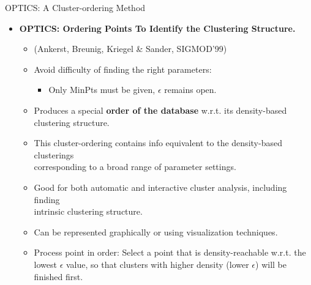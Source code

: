 \begin{frame}{OPTICS: A Cluster-ordering Method}
	\begin{itemize}
		\item \textbf{OPTICS: Ordering Points To Identify the Clustering 
		Structure.}
		\begin{itemize}
			\item (Ankerst, Breunig, Kriegel \& Sander, SIGMOD'99)
			\item Avoid difficulty of finding the right parameters:
			\begin{itemize}
				\item Only MinPts must be given, $\epsilon$ remains open.
			\end{itemize}
			\item Produces a special \textbf{order of the database} w.r.t. its 
			density-based clustering structure.
			\item This cluster-ordering contains info equivalent to the 
			density-based clusterings \\ corresponding to a broad range of 
			parameter settings.
			\item Good for both automatic and interactive cluster analysis, 
			including finding \\
			intrinsic clustering structure.
			\item Can be represented graphically or using visualization 
			techniques.
			\item Process point in order: Select a point that is 
			density-reachable w.r.t. the lowest $\epsilon$ value, so that 
			clusters with higher density (lower $\epsilon$) will be finished 
			first.
		\end{itemize}
	\end{itemize}
\end{frame}

